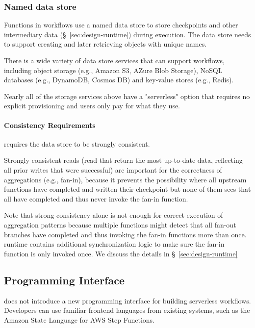 \subsubsection{Named data store}

Functions in \name{} workflows use a named data store to store checkpoints and
other intermediary data (\S~\ref{sec:design-runtime}) during execution. The
data store needs to support creating and later retrieving objects with unique
names.

There is a wide variety of data store services that can support \name{}
workflows, including object storage (e.g., Amazon S3, AZure Blob Storage),
NoSQL databases (e.g., DynamoDB, Cosmos DB) and key-value stores (e.g.,
Redis).

Nearly all of the storage services above have a "serverless" option that
requires no explicit provisioning and users only pay for what they use.

\paragraph{Consistency Requirements}

\name{} requires the data store to be strongly consistent.

Strongly consistent reads (read that return the most up-to-date data,
reflecting all prior writes that were successful) are important for the
correctness of aggregations (e.g., fan-in), because it prevents the
possibility where all upstream functions have completed and written their
checkpoint but none of them sees that all have completed and thus never invoke
the fan-in function.

Note that strong consistency alone is not enough for correct execution of
aggregation patterns because multiple functions might detect that all fan-out
branches have completed and thus invoking the fan-in functions more than once.
\name{} runtime contains additional synchronization logic to make sure the fan-in
function is only invoked once. We discuss the details in
\S~\ref{sec:design-runtime}


\subsection{Programming Interface}\label{sec:design-interface}

\name{} does not introduce a new programming interface for building serverless
workflows. Developers can use familiar frontend languages from existing
systems, such as the Amazon State Language for AWS Step Functions.


